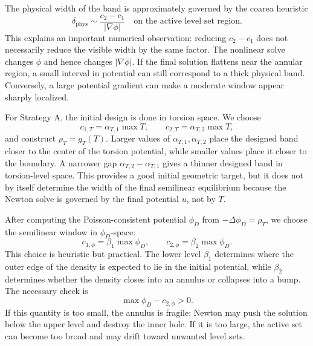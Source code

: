 \documentclass[11pt,a4paper]{article}
\begin{document}
The physical width of the band is approximately governed by the coarea
heuristic
\begin{equation}
  \delta_{\mathrm{phys}}
  \sim
  \frac{c_2-c_1}{|\nabla\phi|}
  \quad\text{on the active level set region}.
\end{equation}
This explains an important numerical observation: reducing $c_2-c_1$ does not
necessarily reduce the visible width by the same factor. The nonlinear solve
changes $\phi$ and hence changes $|\nabla\phi|$. If the final solution flattens
near the annular region, a small interval in potential can still correspond to
a thick physical band. Conversely, a large potential gradient can make a
moderate window appear sharply localized.

For Strategy A, the initial design is done in torsion space. We choose
\begin{equation}
  c_{1,T}=\alpha_{T,1}\max T,
  \qquad
  c_{2,T}=\alpha_{T,2}\max T,
\end{equation}
and construct $\rho_T=g_T(T)$. Larger values of
$\alpha_{T,1},\alpha_{T,2}$ place the designed band closer to the center of the
torsion potential, while smaller values place it closer to the boundary. A
narrower gap $\alpha_{T,2}-\alpha_{T,1}$ gives a thinner designed band in
torsion-level space. This provides a good initial geometric target, but it does
not by itself determine the width of the final semilinear equilibrium because
the Newton solve is governed by the final potential $u$, not by $T$.

After computing the Poisson-consistent potential $\phi_D$ from
$-\Delta\phi_D=\rho_T$, we choose the semilinear window in $\phi_D$-space:
\begin{equation}
  c_{1,\phi}=\beta_1\max\phi_D,
  \qquad
  c_{2,\phi}=\beta_2\max\phi_D.
\end{equation}
This choice is heuristic but practical. The lower level $\beta_1$ determines
where the outer edge of the density is expected to lie in the initial
potential, while $\beta_2$ determines whether the density closes into an
annulus or collapses into a bump. The necessary check is
\begin{equation}
  \max \phi_D-c_{2,\phi}>0.
\end{equation}
If this quantity is too small, the annulus is fragile: Newton may push the
solution below the upper level and destroy the inner hole. If it is too large,
the active set can become too broad and may drift toward unwanted level sets.
\end{document}
